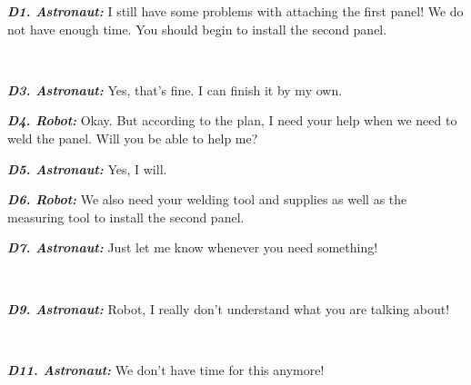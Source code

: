\begin{spacing}{1.2}
\small{
\begin{description}
  \item \textit{\textbf{D1. Astronaut:}} I still have some problems with
  attaching the first panel! We do not have enough time. You should begin to
  install the second panel.\\

  \item {}\\
  
  \item \textit{\textbf{D3. Astronaut:}} Yes, that's fine. I can finish it by my
  own.\\

  \item \textit{\textbf{D4. Robot:}} Okay. But according to the plan, I need
  your help when we need to weld the panel. Will you be able to help me?\\

  \item \textit{\textbf{D5. Astronaut:}} Yes, I will.\\
  
  \item \textit{\textbf{D6. Robot:}} We also need your welding tool and supplies
  as well as the measuring tool to install the second panel.\\
  
  \item \textit{\textbf{D7. Astronaut:}} Just let me know whenever you need
  something!\\
  
  \item {}\\
  
  \item \textit{\textbf{D9. Astronaut:}} Robot, I really don't understand what
  you are talking about!\\
  
  \item {}\\

  \item \textit{\textbf{D11. Astronaut:}} We don't have time for this anymore!
  
\end{description}
}
\end{spacing}

